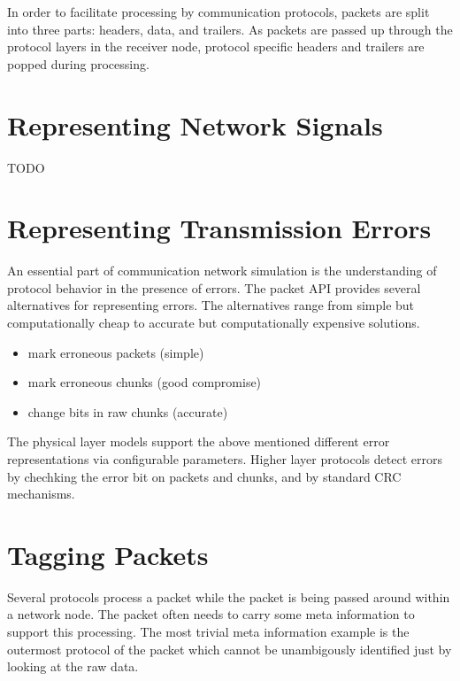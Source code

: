 
In order to facilitate processing by communication protocols, packets are
split into three parts: headers, data, and trailers. As packets are passed
up through the protocol layers in the receiver node, protocol specific
headers and trailers are popped during processing.


\section{Representing Network Signals}

TODO


\section{Representing Transmission Errors}

An essential part of communication network simulation is the understanding
of protocol behavior in the presence of errors. The packet API provides
several alternatives for representing errors. The alternatives range from
simple but computationally cheap to accurate but computationally expensive
solutions.

\begin{itemize}
    \item   mark erroneous packets (simple)
    \item   mark erroneous chunks (good compromise)
    \item   change bits in raw chunks (accurate)
\end{itemize}


The physical layer models support the above mentioned different error
representations via configurable parameters. Higher layer protocols detect
errors by chechking the error bit on packets and chunks, and by standard
CRC mechanisms.

\section{Tagging Packets}

Several protocols process a packet while the packet is being passed around
within a network node. The packet often needs to carry some meta
information to support this processing. The most trivial meta information
example is the outermost protocol of the packet which cannot be
unambigously identified just by looking at the raw data.

